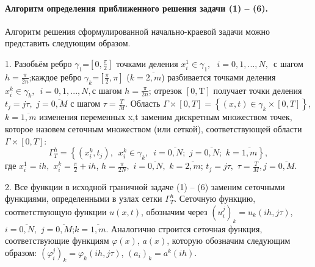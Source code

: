 \paragraph{Алгоритм определения приближенного решения задачи (1) – (6).}

Алгоритм решения сформулированной начально-краевой задачи можно представить следующим образом.

	1. Разобьём ребро ${{\gamma }_{1}}$=$\left[ 0,\frac{\pi }{2} \right]$ точками деления $x_{i}^{1}\in {{\gamma }_{1}},\,\,\,\,i=0,1,...,N,\,\,\, $с шагом $h=\frac{\pi }{2n}$;каждое ребро ${{\gamma }_{k}}$=$ [ \frac{\pi }{2},\pi ]$ ($k=\overline{2,m}$) разбивается точками деления $x_{i}^{k}\in {{\gamma }_{k}},\,\,\,i=0,1,...,N,$с шагом $h=\frac{\pi }{2n}$; отрезок $\left[ 0,\text{T} \right]$ получает точки деления ${{t}_{j}}=j\tau ,$ $j=\overline{0,M}$ с шагом $\tau =\frac{T}{M}$. Область $\Gamma\times [0,T]=\left\{ (x,t)\in {{\gamma }_{k}}\times [0,T] \right\}$, $k=\overline{1,m}$ изменения переменных x,t заменим дискретным множеством точек, которое назовем сеточным множеством (или сеткой), соответствующей области $\Gamma\times [0,T]$:
\[\Gamma_{T}^{h}=\left\{ \left( x_{i}^{k},{{t}_{j}} \right),\,\,\,x_{i}^{k}\in {{\gamma }_{k}},\,\,\,i=\overline{0,N};\,\,j=\overline{0,N};\,\,k=\overline{1,m} \right\},\]
где $x_{i}^{1}=ih,$ $x_{i}^{k}=\frac{\pi }{2}+ih$, $h=\frac{\pi }{2N},$ $i=\overline{0,N},$ $k=\overline{2,m}$; ${{t}_{j}}=j\tau ,$ $\tau =\frac{T}{M},$$j=\overline{0,M}$.

	2. Все функции в исходной граничной задаче (1) – (6) заменим сеточными функциями, определенными в узлах сетки $\Gamma_{T}^{h}$. Сеточную функцию, соответствующую функции $u(x,t)$, обозначим через ${{\left( u_{i}^{j} \right)}_{k}}={{u}_{k}}(ih,j\tau )$, $i=\overline{0,N},$ $j=\overline{0,M}$;$k=\overline{1,m}$. Аналогично строится сеточная функция, соответствующие функциям $\varphi (x)$, $a(x)$, которую обозначим следующим образом: ${{\left( \varphi _{i}^{j} \right)}_{k}}={{\varphi }_{k}}(ih,j\tau )$, ${{({{a}_{i}})}_{k}}={{a}^{k}}(ih)$. 


